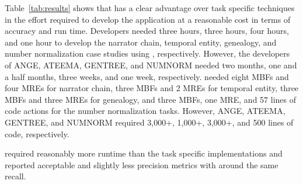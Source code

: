 Table~\ref{tab:results} shows that \framework has a clear advantage over 
task specific techniques in the effort required to develop the application at 
a reasonable cost in terms of accuracy and run time. 
Developers needed three hours, three hours, four hours, and one hour 
to develop the narrator chain, temporal entity, genealogy, and number 
normalization case studies using \framework, respectively. 
However, the developers of ANGE, ATEEMA, GENTREE, and 
NUMNORM needed two months, one and a half months, 
three weeks, and one week, respectively. 
\framework needed eight MBFs and four MREs for narrator chain, 
three MBFs and 2 MREs for temporal entity, three MBFs and three MREs for 
genealogy, and three MBFs, one MRE, and 57 lines of code actions for the number normalization tasks. 
However, ANGE, ATEEMA, GENTREE, and NUMNORM required 
3,000+, 1,000+, 3,000+, and 500 lines of code, respectively.

\framework required reasonably more runtime than the task specific 
implementations and reported acceptable and 
slightly less precision metrics with around
the same recall.

